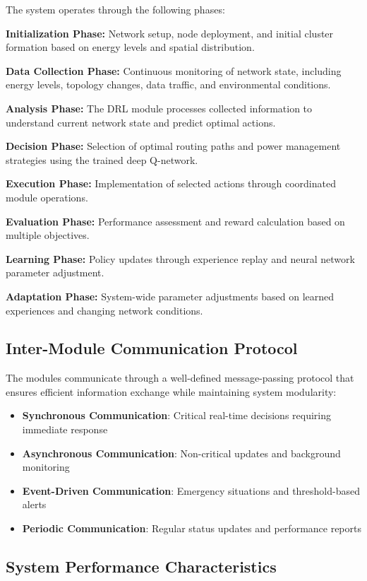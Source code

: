 The system operates through the following phases:

\textbf{Initialization Phase:} Network setup, node deployment, and initial cluster formation based on energy levels and spatial distribution.

\textbf{Data Collection Phase:} Continuous monitoring of network state, including energy levels, topology changes, data traffic, and environmental conditions.

\textbf{Analysis Phase:} The DRL module processes collected information to understand current network state and predict optimal actions.

\textbf{Decision Phase:} Selection of optimal routing paths and power management strategies using the trained deep Q-network.

\textbf{Execution Phase:} Implementation of selected actions through coordinated module operations.

\textbf{Evaluation Phase:} Performance assessment and reward calculation based on multiple objectives.

\textbf{Learning Phase:} Policy updates through experience replay and neural network parameter adjustment.

\textbf{Adaptation Phase:} System-wide parameter adjustments based on learned experiences and changing network conditions.

\subsection{Inter-Module Communication Protocol}

The modules communicate through a well-defined message-passing protocol that ensures efficient information exchange while maintaining system modularity:

\begin{itemize}
    \item \textbf{Synchronous Communication}: Critical real-time decisions requiring immediate response
    \item \textbf{Asynchronous Communication}: Non-critical updates and background monitoring
    \item \textbf{Event-Driven Communication}: Emergency situations and threshold-based alerts
    \item \textbf{Periodic Communication}: Regular status updates and performance reports
\end{itemize}

\subsection{System Performance Characteristics}

